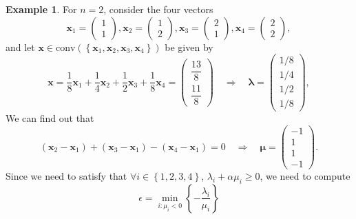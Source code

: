 \documentclass[12pt]{report}
\theoremstyle{definition}
\begin{document}
\newtheorem{caratheodory example}[theorem]{Example}
\begin{caratheodory example}
    For $n=2$, consider the four vectors
    \[
        \mathbf{x}_1=
        \begin{pmatrix}
            1 \\
            1
        \end{pmatrix},
        \mathbf{x}_2=
        \begin{pmatrix}
            1 \\
            2
        \end{pmatrix},
        \mathbf{x}_3=
        \begin{pmatrix}
            2 \\
            1
        \end{pmatrix},
        \mathbf{x}_4=
        \begin{pmatrix}
            2 \\
            2
        \end{pmatrix},
    \]
    and let
    $\mathbf{x}\in\text{conv}(\left\{\mathbf{x}_1,\mathbf{x}_2,\mathbf{x}_3,\mathbf{x}_4\right\})$
    be given by
    \[
        \mathbf{x}=\frac{1}{8}\mathbf{x}_1+\frac{1}{4}\mathbf{x}_2+\frac{1}{2}\mathbf{x}_3+\frac{1}{8}\mathbf{x}_4
        =
        \begin{pmatrix}
            \dfrac{13}{8} \\[2ex]
            \dfrac{11}{8}
        \end{pmatrix}
        \quad\Longrightarrow\quad
        \pmb{\lambda}=
        \begin{pmatrix}
            1/8 \\
            1/4 \\
            1/2 \\
            1/8
        \end{pmatrix},
    \]
    We can find out that
    \[
        (\mathbf{x}_2-\mathbf{x}_1)
        +(\mathbf{x}_3-\mathbf{x}_1)
        -(\mathbf{x}_4-\mathbf{x}_1)=0
        \quad\Longrightarrow\quad
        \pmb{\mu}=
        \begin{pmatrix}
            -1 \\
            1 \\
            1 \\
            -1
        \end{pmatrix}.
    \]
    Since we need to satisfy that $\forall i\in\left\{1,2,3,4\right\}$,
    $\lambda_i+\alpha\mu_i\ge 0$, we need to compute
    \[
        \epsilon=\underset{i:\mu_i<0}{\min}\left\{-\frac{\lambda_i}{\mu_i}\right\}
\]
\end{caratheodory example}
\end{document}
